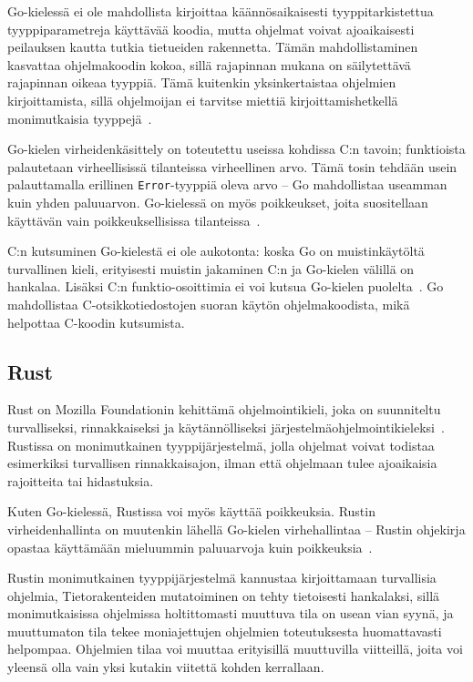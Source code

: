 Go-kielessä ei ole mahdollista kirjoittaa käännösaikaisesti tyyppitarkistettua
tyyppiparametreja käyttävää koodia, mutta ohjelmat voivat ajoaikaisesti
peilauksen kautta tutkia tietueiden rakennetta.
Tämän mahdollistaminen kasvattaa ohjelmakoodin kokoa, sillä rajapinnan mukana
on säilytettävä rajapinnan oikeaa tyyppiä. Tämä kuitenkin yksinkertaistaa
ohjelmien kirjoittamista, sillä ohjelmoijan ei tarvitse miettiä
kirjoittamishetkellä monimutkaisia tyyppejä~\citep[esim.][kalvo 8]{gohistory}.

Go-kielen virheidenkäsittely on toteutettu useissa kohdissa C:n tavoin;
funktioista palautetaan virheellisissä tilanteissa virheellinen arvo. Tämä
tosin tehdään usein palauttamalla erillinen \texttt{Error}-tyyppiä oleva arvo
-- Go mahdollistaa useamman kuin yhden paluuarvon. Go-kielessä on myös
poikkeukset, joita suositellaan käyttävän vain poikkeuksellisissa
tilanteissa~\citep{effectivego}.

C:n kutsuminen Go-kielestä ei ole aukotonta: koska Go on muistinkäytöltä
turvallinen kieli, erityisesti muistin jakaminen C:n ja Go-kielen välillä on
hankalaa. Lisäksi C:n funktio-osoittimia ei voi kutsua Go-kielen
puolelta~\citep{cgo}. Go mahdollistaa C-otsikkotiedostojen suoran käytön
ohjelmakoodista, mikä helpottaa C-koodin kutsumista.

\subsection{Rust}

Rust on Mozilla Foundationin kehittämä ohjelmointikieli, joka on suunniteltu
turvalliseksi, rinnakkaiseksi ja käytännölliseksi
järjestelmäohjelmointikieleksi~\citep{rustfaq}. Rustissa on monimutkainen
tyyppijärjestelmä, jolla ohjelmat voivat todistaa esimerkiksi turvallisen
rinnakkaisajon, ilman että ohjelmaan tulee ajoaikaisia rajoitteita tai
hidastuksia.

Kuten Go-kielessä, Rustissa voi myös käyttää poikkeuksia. Rustin
virheidenhallinta on muutenkin lähellä Go-kielen virhehallintaa -- Rustin
ohjekirja opastaa käyttämään mieluummin paluuarvoja kuin
poikkeuksia~\citep{rusterrorhandling}.

Rustin monimutkainen tyyppijärjestelmä kannustaa kirjoittamaan turvallisia
ohjelmia, Tietorakenteiden mutatoiminen on tehty tietoisesti hankalaksi, sillä
monimutkaisissa ohjelmissa holtittomasti muuttuva tila on usean vian syynä, ja
muuttumaton tila tekee moniajettujen ohjelmien toteutuksesta huomattavasti
helpompaa\citationneeded. Ohjelmien tilaa voi muuttaa erityisillä muuttuvilla
viitteillä, joita voi yleensä olla vain yksi kutakin
viitettä kohden kerrallaan.


